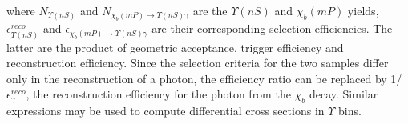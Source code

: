 \noindent where
${N_{\Upsilon(nS)}}$ and ${N_{\chi_b(mP)\to \Upsilon(nS) \gamma}}$ are the
$\Upsilon(nS)$ and $\chi_b(mP)$ yields, $\epsilon_{\Upsilon(nS)}^{reco}$ and
$\epsilon_{\chi_b(mP)\to \Upsilon(nS) \gamma}$ are their corresponding selection
efficiencies. The latter are the product of geometric acceptance, trigger
efficiency and reconstruction efficiency. Since the selection criteria for the
two samples differ only in the reconstruction of a photon, the efficiency ratio
can be replaced by 1/$\epsilon^{reco}_{\gamma}$, the reconstruction efficiency for the
photon from the $\chi_b$ decay. Similar expressions may be used to compute
differential cross sections in $\Upsilon$ \pt bins.